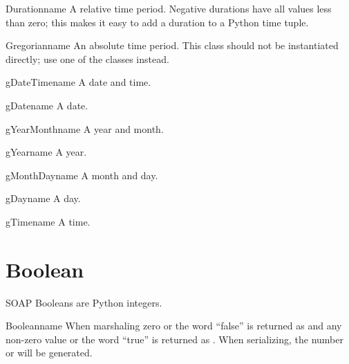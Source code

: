 \begin{classdesc}{Duration}{name}
A relative time period.
Negative durations have all values less than zero; this makes
it easy to add a duration to a Python time tuple.
\end{classdesc}

\begin{classdesc}{Gregorian}{name}
An absolute time period.
This class should not be instantiated directly; use one of the 
classes instead.
\end{classdesc}

\begin{classdesc}{gDateTime}{name}
A date and time.
\end{classdesc}

\begin{classdesc}{gDate}{name}
A date.
\end{classdesc}

\begin{classdesc}{gYearMonth}{name}
A year and month.
\end{classdesc}

\begin{classdesc}{gYear}{name}
A year.
\end{classdesc}

\begin{classdesc}{gMonthDay}{name}
A month and day.
\end{classdesc}

\begin{classdesc}{gDay}{name}
A day.
\end{classdesc}

\begin{classdesc}{gTime}{name}
A time.
\end{classdesc}

\section{Boolean}

SOAP Booleans are Python integers.

\begin{classdesc}{Boolean}{name}
When marshaling zero or the word ``false'' is returned as 
and any non-zero value or the word ``true'' is returned as .
When serializing, the number  or  will be generated.
\end{classdesc}

